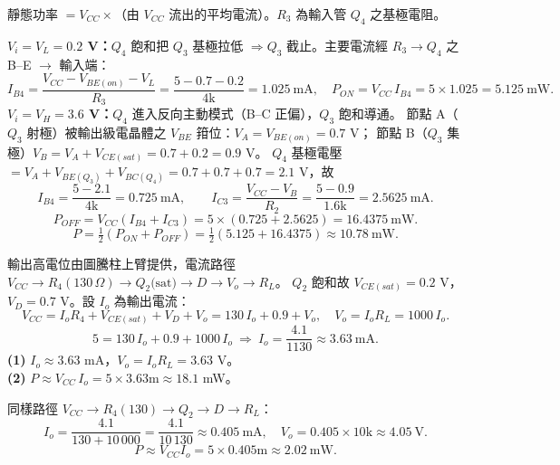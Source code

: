 \documentclass[12pt]{article}
\begin{document}
\sol 靜態功率 $=V_{CC}\times$（由 $V_{CC}$ 流出的平均電流）。$R_3$ 為輸入管 $Q_4$ 之基極電阻。

\textbf{$V_i=V_L=0.2$ V：}$Q_4$ 飽和把 $Q_3$ 基極拉低 $\Rightarrow Q_3$ 截止。主要電流經 $R_3\to Q_4$ 之 B--E $\to$ 輸入端：
\[ I_{B4}=\frac{V_{CC}-V_{BE(on)}-V_L}{R_3}=\frac{5-0.7-0.2}{4\text{k}}=1.025\ \text{mA},\quad P_{ON}=V_{CC}\,I_{B4}=5\times1.025=5.125\ \text{mW}. \]
\textbf{$V_i=V_H=3.6$ V：}$Q_4$ 進入反向主動模式（B--C 正偏），$Q_3$ 飽和導通。
節點 A（$Q_3$ 射極）被輸出級電晶體之 $V_{BE}$ 箝位：$V_A=V_{BE(on)}=0.7$ V；
節點 B（$Q_3$ 集極）$V_B=V_A+V_{CE(sat)}=0.7+0.2=0.9$ V。
$Q_4$ 基極電壓 $=V_A+V_{BE(Q_3)}+V_{BC(Q_4)}=0.7+0.7+0.7=2.1$ V，故
\[ I_{B4}=\frac{5-2.1}{4\text{k}}=0.725\ \text{mA},\qquad
   I_{C3}=\frac{V_{CC}-V_B}{R_2}=\frac{5-0.9}{1.6\text{k}}=2.5625\ \text{mA}. \]
\[ P_{OFF}=V_{CC}(I_{B4}+I_{C3})=5\times(0.725+2.5625)=16.4375\ \text{mW}. \]
\[ P=\tfrac12(P_{ON}+P_{OFF})=\tfrac12(5.125+16.4375)\approx10.78\ \text{mW}. \]

\begin{minipage}{0.62\linewidth}
\end{minipage}\hfill
\begin{minipage}{0.35\linewidth}
\end{minipage}

\sol 輸出高電位由圖騰柱上臂提供，電流路徑 $V_{CC}\to R_4(130\,\Omega)\to Q_2\text{(sat)}\to D\to V_o\to R_L$。
$Q_2$ 飽和故 $V_{CE(sat)}=0.2$ V，$V_D=0.7$ V。設 $I_o$ 為輸出電流：
\[ V_{CC}=I_o R_4+V_{CE(sat)}+V_D+V_o=130\,I_o+0.9+V_o,\quad V_o=I_o R_L=1000\,I_o. \]
\[ 5=130\,I_o+0.9+1000\,I_o\ \Rightarrow\ I_o=\frac{4.1}{1130}\approx3.63\ \text{mA}. \]
\textbf{(1)} $I_o\approx3.63$ mA，$V_o=I_oR_L=3.63$ V。\\
\textbf{(2)} $P\approx V_{CC}\,I_o=5\times3.63\text{m}\approx18.1$ mW。

\sol 同樣路徑 $V_{CC}\to R_4(130)\to Q_2\to D\to R_L$：
\[ I_o=\frac{4.1}{130+10\,000}=\frac{4.1}{10\,130}\approx0.405\ \text{mA},\quad
   V_o=0.405\times10\text{k}\approx4.05\ \text{V}. \]
\[ P\approx V_{CC}I_o=5\times0.405\text{m}\approx2.02\ \text{mW}. \]
\end{document}
